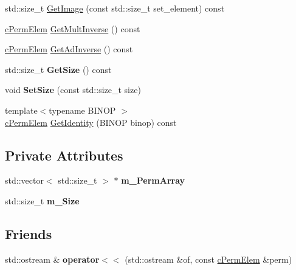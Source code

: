 \begin{DoxyCompactItemize}
\item 
std\-::size\-\_\-t \hyperlink{classcPermElem_adad3b042383cf3538bfec790188987c3}{\-Get\-Image} (const std\-::size\-\_\-t set\-\_\-element) const 
\item 
\hyperlink{classcPermElem}{c\-Perm\-Elem} \hyperlink{classcPermElem_adbb23b8a368e0d01cd2b450ad0be5efb}{\-Get\-Mult\-Inverse} () const 
\item 
\hyperlink{classcPermElem}{c\-Perm\-Elem} \hyperlink{classcPermElem_a11cc987f70282d2984c04c6e058c41e8}{\-Get\-Ad\-Inverse} () const 
\item 
\hypertarget{classcPermElem_a773fc9acee08d4c86d391439574eaf3e}{
std\-::size\-\_\-t {\bfseries \-Get\-Size} () const }
\label{classcPermElem_a773fc9acee08d4c86d391439574eaf3e}

\item 
\hypertarget{classcPermElem_a1427d28ce2e7fc914570d80f3c7a0f38}{
void {\bfseries \-Set\-Size} (const std\-::size\-\_\-t size)}
\label{classcPermElem_a1427d28ce2e7fc914570d80f3c7a0f38}

\item 
{\footnotesize template$<$typename B\-I\-N\-O\-P $>$ }\\\hyperlink{classcPermElem}{c\-Perm\-Elem} \hyperlink{classcPermElem_a7f5392e3279b766d5f85c01d363c2941}{\-Get\-Identity} (\-B\-I\-N\-O\-P binop) const 
\end{DoxyCompactItemize}
\subsection*{\-Private \-Attributes}
\begin{DoxyCompactItemize}
\item 
\hypertarget{classcPermElem_a60fc59bfe827b07c6567a3b7a5a25726}{
std\-::vector$<$ std\-::size\-\_\-t $>$ $\ast$ {\bfseries m\-\_\-\-Perm\-Array}}
\label{classcPermElem_a60fc59bfe827b07c6567a3b7a5a25726}

\item 
\hypertarget{classcPermElem_aebe367a2309a8c9ca2d1f172ad4a735e}{
std\-::size\-\_\-t {\bfseries m\-\_\-\-Size}}
\label{classcPermElem_aebe367a2309a8c9ca2d1f172ad4a735e}

\end{DoxyCompactItemize}
\subsection*{\-Friends}
\begin{DoxyCompactItemize}
\item 
\hypertarget{classcPermElem_a4211aa547f8e3f2dc6b44ad07f7224db}{
std\-::ostream \& {\bfseries operator$<$$<$} (std\-::ostream \&of, const \hyperlink{classcPermElem}{c\-Perm\-Elem} \&perm)}
\label{classcPermElem_a4211aa547f8e3f2dc6b44ad07f7224db}

\end{DoxyCompactItemize}


